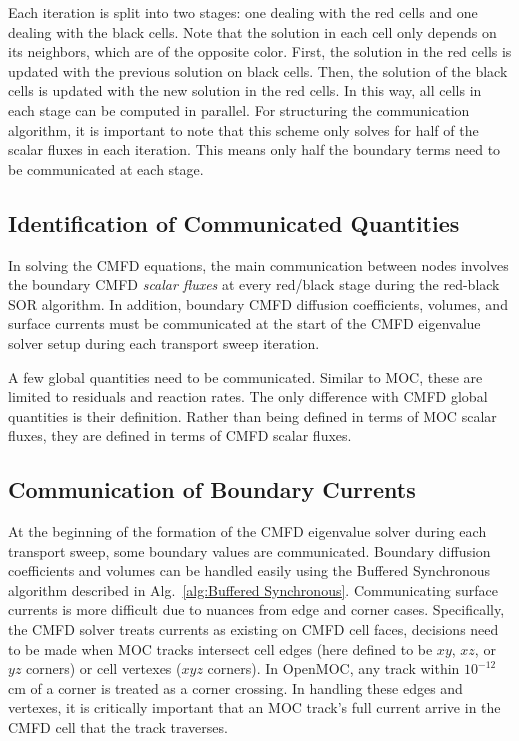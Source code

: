 Each iteration is split into two stages: one dealing with the red cells and one dealing with the black cells. Note that the solution in each cell only depends on its neighbors, which are of the opposite color. First, the solution in the red cells is updated with the previous solution on black cells. Then, the solution of the black cells is updated with the new solution in the red cells. In this way, all cells in each stage can be computed in parallel. For structuring the communication algorithm, it is important to note that this scheme only solves for half of the scalar fluxes in each iteration. This means only half the boundary terms need to be communicated at each stage.

\subsection{Identification of Communicated Quantities}

In solving the \ac{CMFD} equations, the main communication between nodes involves the boundary \ac{CMFD} \textit{scalar fluxes} at every red/black stage during the red-black SOR algorithm. In addition, boundary \ac{CMFD} diffusion coefficients, volumes, and surface currents must be communicated at the start of the \ac{CMFD} eigenvalue solver setup during each transport sweep iteration.

A few global quantities need to be communicated. Similar to \ac{MOC}, these are limited to residuals and reaction rates. The only difference with \ac{CMFD} global quantities is their definition. Rather than being defined in terms of \ac{MOC} scalar fluxes, they are defined in terms of \ac{CMFD} scalar fluxes.


\subsection{Communication of Boundary Currents}

At the beginning of the formation of the \ac{CMFD} eigenvalue solver during each transport sweep, some boundary values are communicated. Boundary diffusion coefficients and volumes can be handled easily using the Buffered Synchronous algorithm described in Alg.~\ref{alg:Buffered Synchronous}. Communicating surface currents is more difficult due to nuances from edge and corner cases. Specifically, the \ac{CMFD} solver treats currents as existing on CMFD cell faces, decisions need to be made when \ac{MOC} tracks intersect cell edges (here defined to be $xy$, $xz$, or $yz$ corners) or cell vertexes ($xyz$ corners). In OpenMOC, any track within $10^{-12}$ cm of a corner is treated as a corner crossing. In handling these edges and vertexes, it is critically important that an \ac{MOC} track's full current arrive in the CMFD cell that the track traverses.

